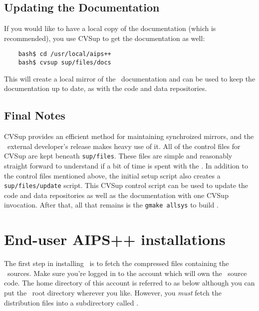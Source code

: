 \subsection{Updating the Documentation }
\label{developer release documentation}

If you would like to have a local copy of the documentation (which is recommended),
you use CVSup to get the documentation as well:
\begin{verbatim}
    bash$ cd /usr/local/aips++
    bash$ cvsup sup/files/docs
\end{verbatim}
This will create a local mirror of the \aipspp\ documentation and can be
used to keep the documentation up to date, as with the code and data
repositories.

\subsection{Final Notes}

CVSup provides an efficient method for maintaining synchroized mirrors, and
the \aipspp\ external developer's release makes heavy use of it. All of the
control files for CVSup are kept beneath \verb+sup/files+. These files are
simple and reasonably straight forward to understand if a bit of time is
spent with the
.
In addition to the control files mentioned above, the initial setup script
also creates a \verb+sup/files/update+ script. This CVSup control script
can be used to update the code and data repositories as well as the documentation
with one CVSup invocation. After that, all that remains is the \verb+gmake allsys+
to build \aipspp.


\section{End-user AIPS++ installations}
\label{End-user installation}

The first step in installing \aipspp\ is to fetch the compressed 
files containing the \aipspp\ sources.  Make sure you're logged in to the
account which will own the \aipspp\ source code.  The home directory of this
account is referred to as  below although you can put the
\aipspp\ root directory wherever you like.  However, you {\em must} fetch the
distribution files into a subdirectory called .

